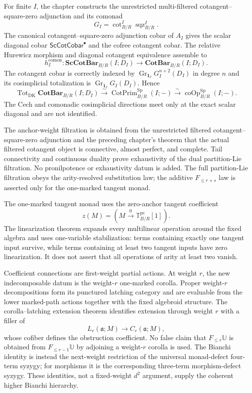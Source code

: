 For finite $I$, the chapter constructs the unrestricted multi-filtered
cotangent--square-zero adjunction and its comonad
\[
    G_I
    =
    \operatorname{cot}^{I}_{B/R}
    \operatorname{sqz}^{I}_{B/R}.
\]
The canonical cotangent--square-zero adjunction cobar of $A_I$ gives the scalar
diagonal cobar $\mathsf{ScCotCobar}^{\bullet}$ and the cofree cotangent cobar.
The relative Hurewicz morphism and diagonal cotangent equivalence assemble to
\[
    h_I^{\mathrm{comon}}:
    \mathbf{ScCotBar}_{B/R}(I;D_I)
    \longrightarrow
    \mathbf{CotBar}_{B/R}(I;D_I).
\]
The cotangent cobar is correctly indexed by
$\operatorname{Gr}_{\mathbf1_I}G_I^{n+2}(D_I)$ in degree $n$ and its
cosimplicial totalization is
$\operatorname{Gr}_{\mathbf1_I}G_I(D_I)$.  Hence
\[
    \operatorname{Tot}_{\mathrm{DK}}\mathbf{CotBar}_{B/R}(I;D_I)
    \xrightarrow{\sim}
    \operatorname{CotPrim}^{\mathrm{Sp}}_{B/R}(I;-)
    \xrightarrow{\sim}
    \operatorname{coOp}^{\mathrm{Sp}}_{B/R}(I;-).
\]
The Cech and comonadic cosimplicial directions meet only at the exact scalar
diagonal and are not identified.

The anchor-weight filtration is obtained from the unrestricted filtered
cotangent--square-zero adjunction and the preceding chapter's theorem that the
actual filtered cotangent object is connective, almost perfect, and complete.
Tail connectivity and continuous duality prove exhaustivity of the dual
partition-Lie filtration.  No pronilpotence or exhaustivity datum is added.
The full partition-Lie filtration obeys the arity-resolved substitution law;
the additive $F_{\le r+s}$ law is asserted only for the one-marked tangent
monad.

The one-marked tangent monad uses the zero-anchor tangent coefficient
\[
    z(M)=\left(M\xrightarrow0\mathbb T_{B/R}^{\mathrm{pc}}[1]\right).
\]
The linearization theorem expands every multilinear operation around the fixed
algebra and uses one-variable stabilization: terms containing exactly one
tangent input survive, while terms containing at least two tangent inputs have
zero linearization.  It does not assert that all operations of arity at least
two vanish.

Coefficient connections are first-weight partial actions.  At weight $r$, the
new indecomposable datum is the weight-$r$ one-marked corolla.  Proper
weight-$r$ decompositions form its punctured latching category and are
evaluable from the lower marked-path actions together with the fixed
algebroid structure.  The corolla--latching extension theorem identifies
extension through weight $r$ with a filler of
\[
    L_r(\mathfrak a;M)\longrightarrow C_r(\mathfrak a;M),
\]
whose cofiber defines the obstruction coefficient.  No false claim that
$F_{\le r}\mathbb U$ is obtained from $F_{\le r-1}\mathbb U$ by adjoining a
weight-$r$ corolla is used.  The Bianchi identity is instead the next-weight
restriction of the universal monad-defect four-term syzygy; for morphisms it
is the corresponding three-term morphism-defect syzygy.  These identities,
not a fixed-weight $d^2$ argument, supply the coherent higher Bianchi
hierarchy.

